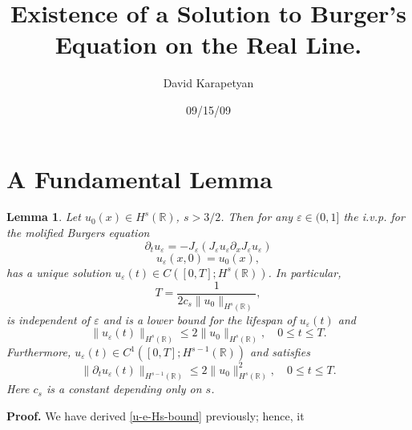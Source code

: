 \documentclass[12pt,reqno]{amsart}
\newcommand{\rr}{\mathbb{R}}
\newcommand{\p}{\partial}
\newcommand{\ee}{\varepsilon}
\theoremstyle{plain}  %
\newtheorem{lemma}{Lemma}
\theoremstyle{definition}
\begin{document}
\title{ Existence of a Solution to Burger's Equation on the Real Line.}
\author{David Karapetyan}
\address{Department of Mathematics  \\
         University  of Notre Dame\\
		          Notre Dame, IN 46556 }
				  \date{09/15/09}
				  \maketitle
				  \parindent0in
				  \parskip0.1in
				  \section{A Fundamental Lemma}
				  \setcounter{equation}{0}
\begin{lemma}
		\label{hr_wp}
		Let  $u_0(x) \in  H^s(\rr)$, $s >3/2$. Then for any $\ee\in (0, 1]$
		the i.v.p. for the molified Burgers equation 
		\begin{equation} 
			\label{hr-moli-2}
			\partial_t  u_\ee 
			=
			- J_\ee(J_\ee u_\ee \partial_x  J_\ee  u_\ee) 
			\end{equation} 
		\begin{equation} 
			\label{burgers-moli-data-2} 
			u_\ee(x, 0) = u_0 (x),
		\end{equation}
		has a unique solution $u_\ee( t)\in C([0, T]; H^s(\rr))$. 
		In particular,
		\begin{equation} 
			\label{life-est}
			T
			=
			\frac{1}{2 c_s \|u_0\|_{H^s(\rr)}},
		\end{equation}
		is independent of $\ee$ and
		is a lower bound for the lifespan of $u_\ee( t)$ and
		\begin{equation}
			\label{u-e-Hs-bound}
			\|u_\ee(t)\|_{H^s(\rr)}
			\le
			2 \|u_0 \|_{H^s(\rr)},
			\quad
			0\le t \le T.
		\end{equation}
		Furthermore,  $u_\ee( t)\in C^1([0, T]; H^{s-1}(\rr))$ and 
		satisfies
		\begin{equation}
			\label{dt-u-e-Hs-bound}
			\|\p_tu_\ee(t)\|_{H^{s-1}(\rr)}
			\le
			2 \|u_0 \|_{H^s(\rr)}^2,
			\quad
			0\le t \le T.
		\end{equation}
		Here  $c_s$ is a constant depending only on $s$.
	\end{lemma}
	{\bf Proof.} We have derived \eqref{u-e-Hs-bound} previously; hence, it
\end{document}
